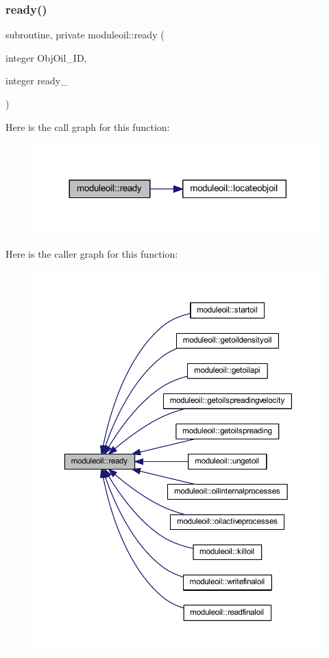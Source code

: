 \subsubsection{\texorpdfstring{ready()}{ready()}}
{\footnotesize\ttfamily subroutine, private moduleoil\+::ready (\begin{DoxyParamCaption}\item[{integer}]{Obj\+Oil\+\_\+\+ID,  }\item[{integer}]{ready\+\_\+ }\end{DoxyParamCaption})\hspace{0.3cm}{\ttfamily [private]}}

Here is the call graph for this function\+:\nopagebreak
\begin{figure}[H]
\begin{center}
\leavevmode
\includegraphics[width=317pt]{namespacemoduleoil_a16763a360a31b49d4f67bbba295472a5_cgraph}
\end{center}
\end{figure}
Here is the caller graph for this function\+:\nopagebreak
\begin{figure}[H]
\begin{center}
\leavevmode
\includegraphics[width=350pt]{namespacemoduleoil_a16763a360a31b49d4f67bbba295472a5_icgraph}
\end{center}
\end{figure}
